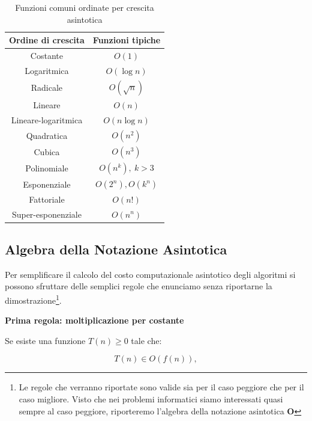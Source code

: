 \begin{table}[h!]
	\centering

	\renewcommand{\arraystretch}{1.5}

	\setlength{\tabcolsep}{12pt}
	\begin{tabular}{|c|c|}
		\hline
		\textbf{Ordine di crescita} & \textbf{Funzioni tipiche} \\
		\hline
		Costante & $O(1)$ \\
		\hline
		Logaritmica & $O(\log n)$ \\
		\hline
		Radicale & $O(\sqrt{n})$ \\
		\hline
		Lineare & $O(n)$ \\
		\hline
		Lineare-logaritmica & $O(n \log n)$ \\
		\hline
		Quadratica & $O(n^2)$ \\
		\hline
		Cubica & $O(n^3)$ \\
		\hline
		Polinomiale & $O(n^k),\ k>3$ \\
		\hline
		Esponenziale & $O(2^n), O(k^n)$ \\
		\hline
		Fattoriale & $O(n!)$ \\
		\hline
		Super-esponenziale & $O(n^n)$ \\
		\hline
	\end{tabular}
	\caption{Funzioni comuni ordinate per crescita asintotica}
	\label{tab:1 - Complessità Computazionale:ordine_crescita}
\end{table}



\subsection{Algebra della Notazione Asintotica}

Per semplificare il calcolo del costo computazionale asintotico degli algoritmi si possono sfruttare delle semplici regole che enunciamo senza riportarne la dimostrazione\footnote{Le regole che verranno riportate sono valide sia per il caso peggiore che per il caso migliore. Visto che nei problemi informatici siamo interessati quasi sempre al caso peggiore, riporteremo l'algebra della notazione asintotica \textbf{O}}.

\vspace{1cm}

\textbf{Prima regola: moltiplicazione per costante}  

Se esiste una funzione $T(n) \ge 0$ tale che:

\[
T(n) \in O(f(n)),
\]

